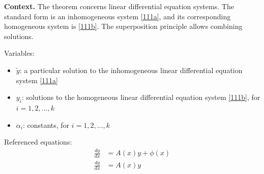 \noindent\textbf{Context.}
The theorem concerns linear differential equation systems. The standard form is an inhomogeneous system \eqref{111a}, and its corresponding homogeneous system is \eqref{111b}. The superposition principle allows combining solutions.

Variables:
\begin{itemize}
    \item $\tilde{y}$: a particular solution to the inhomogeneous linear differential equation system \eqref{111a}
    \item $y_i$: solutions to the homogeneous linear differential equation system \eqref{111b}, for $i = 1, 2, \dots, k$
    \item $\alpha_i$: constants, for $i = 1, 2, \dots, k$
\end{itemize}

Referenced equations:
\begin{align}
    \frac{dy}{dx} &= A(x)y + \phi(x) \label{111a} \\
    \frac{dy}{dx} &= A(x)y \label{111b}
\end{align}

